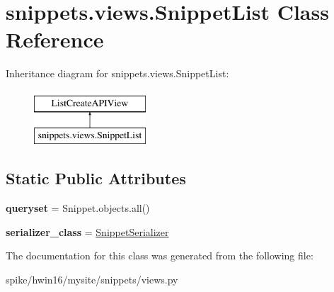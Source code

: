 \hypertarget{classsnippets_1_1views_1_1_snippet_list}{}\section{snippets.\+views.\+Snippet\+List Class Reference}
\label{classsnippets_1_1views_1_1_snippet_list}
Inheritance diagram for snippets.\+views.\+Snippet\+List\+:\begin{figure}[H]
\begin{center}
\leavevmode
\includegraphics[height=2.000000cm]{classsnippets_1_1views_1_1_snippet_list}
\end{center}
\end{figure}
\subsection*{Static Public Attributes}
\begin{DoxyCompactItemize}
\item 
\mbox{\label{classsnippets_1_1views_1_1_snippet_list_a368dca5c3168908e0d6cb96fee19f79a}} 
{\bfseries queryset} = Snippet.\+objects.\+all()
\item 
\mbox{\label{classsnippets_1_1views_1_1_snippet_list_a9dc5cbbc6d8e0143ef9c361d6d2f707e}} 
{\bfseries serializer\+\_\+class} = \mbox{\hyperlink{classsnippets_1_1serializers_1_1_snippet_serializer}{Snippet\+Serializer}}
\end{DoxyCompactItemize}


The documentation for this class was generated from the following file\+:\begin{DoxyCompactItemize}
\item 
spike/hwin16/mysite/snippets/views.\+py\end{DoxyCompactItemize}
